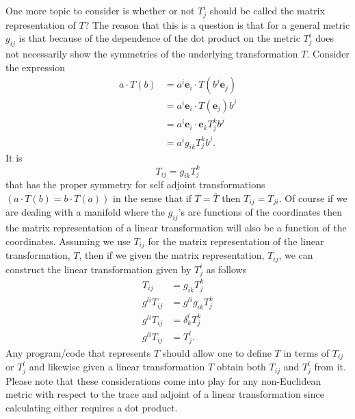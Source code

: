 \documentclass[12pt]{report}
\newcommand{\bm}[1]{\boldsymbol{#1}}
\newcommand{\lp}{\left (}
\newcommand{\rp}{\right )}
\newcommand{\f}[2]{{#1}\lp {#2} \rp}
\newcommand{\eb}{\bm{e}}
\begin{document}
One more topic to consider is whether or not $T^{i}_{j}$ should be called the matrix representation of $T$? The reason that
this is a question is that for a general metric $g_{ij}$ is that because of the dependence of the dot product on the metric
$T^{i}_{j}$ does not necessarily show the symmetries of the underlying transformation $T$. Consider the expression
\begin{align}
	a\cdot\f{T}{b} &= a^{i}\eb_{i}\cdot\f{T}{b^{j}\eb_{j}} \nonumber \\
	               &= a^{i}\eb_{i}\cdot \f{T}{\eb_{j}}b^{j} \nonumber \\
	               &= a^{i}\eb_{i}\cdot\eb_{k} T_{j}^{k}b^{j} \nonumber \\
	               &= a^{i}g_{ik}T_{j}^{k}b^{j}.
\end{align}
It is
\begin{equation}
	T_{ij} = g_{ik}T_{j}^{k}
\end{equation}
that has the proper symmetry for self adjoint transformations $(a\cdot\f{T}{b} = b\cdot\f{T}{a})$ in the sense that if 
$T = \overline{T}$ then $T_{ij} = T_{ji}$. Of course if we are dealing with a manifold where the $g_{ij}$'s are functions
of the coordinates then the matrix representation of a linear transformation will also be a function of the coordinates. 
Assuming we use $T_{ij}$ for the matrix representation of the linear transformation, $T$, then if we given the matrix 
representation, $T_{ij}$, we can construct the linear transformation given by $T^{i}_{j}$ as follows
\begin{align}
	T_{ij} &= g_{ik}T_{j}^{k} \nonumber \\
	g^{li}T_{ij} &= g^{li}g_{ik}T_{j}^{k} \nonumber \\
	g^{li}T_{ij} &= \delta_{k}^{l}T_{j}^{k} \nonumber \\
	g^{li}T_{ij} &= T_{j}^{l}.
\end{align} 
Any program/code that represents $T$ should allow one to define $T$ in terms of $T_{ij}$ or $T_{j}^{l}$ and likewise 
given a linear transformation $T$ obtain both $T_{ij}$ and $T_{j}^{l}$ from it. Please note that these considerations 
come into play for any non-Euclidean metric with respect to the trace and adjoint of a linear transformation since 
calculating either requires a dot product.
\end{document}
